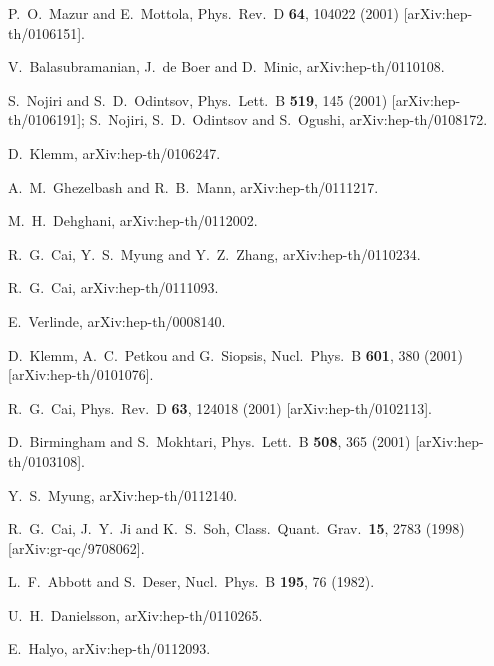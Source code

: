 \documentclass[a4paper,12pt]{article}
\begin{document}
\begin{thebibliography}{99}
P.~O.~Mazur and E.~Mottola,
Phys.\ Rev.\ D {\bf 64}, 104022 (2001)
[arXiv:hep-th/0106151].


V.~Balasubramanian, J.~de Boer and D.~Minic,
arXiv:hep-th/0110108.

S.~Nojiri and S.~D.~Odintsov,
Phys.\ Lett.\ B {\bf 519}, 145 (2001)
[arXiv:hep-th/0106191];
S.~Nojiri, S.~D.~Odintsov and S.~Ogushi,
arXiv:hep-th/0108172.

 
D.~Klemm,
arXiv:hep-th/0106247.


A.~M.~Ghezelbash and R.~B.~Mann,
arXiv:hep-th/0111217.

M.~H.~Dehghani,
arXiv:hep-th/0112002.


R.~G.~Cai, Y.~S.~Myung and Y.~Z.~Zhang,
arXiv:hep-th/0110234.

R.~G.~Cai,
arXiv:hep-th/0111093.

E.~Verlinde,
arXiv:hep-th/0008140.

D.~Klemm, A.~C.~Petkou and G.~Siopsis,
Nucl.\ Phys.\ B {\bf 601}, 380 (2001)
[arXiv:hep-th/0101076].

R.~G.~Cai,
Phys.\ Rev.\ D {\bf 63}, 124018 (2001)
[arXiv:hep-th/0102113].

D.~Birmingham and S.~Mokhtari,
Phys.\ Lett.\ B {\bf 508}, 365 (2001)
[arXiv:hep-th/0103108].


Y.~S.~Myung,
arXiv:hep-th/0112140.

R.~G.~Cai, J.~Y.~Ji and K.~S.~Soh,
Class.\ Quant.\ Grav.\  {\bf 15}, 2783 (1998)
[arXiv:gr-qc/9708062].

L.~F.~Abbott and S.~Deser,
Nucl.\ Phys.\ B {\bf 195}, 76 (1982).


U.~H.~Danielsson,
arXiv:hep-th/0110265.

E.~Halyo,
arXiv:hep-th/0112093.


\end{thebibliography}
\end{document}
